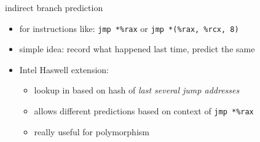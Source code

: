 \begin{frame}{indirect branch prediction}
    \begin{itemize}
        \item for instructions like: \texttt{jmp *\%rax} or \texttt{jmp *(\%rax, \%rcx, 8)}
        \item simple idea: record what happened last time, predict the same
        \vspace{.5cm}
        \item Intel Haswell extension:
            \begin{itemize}
            \item lookup in based on hash of \textit{last several jump addresses}
            \item allows different predictions based on context of \texttt{jmp *\%rax}
            \item really useful for polymorphism
            \end{itemize}
    \end{itemize}
\end{frame}
